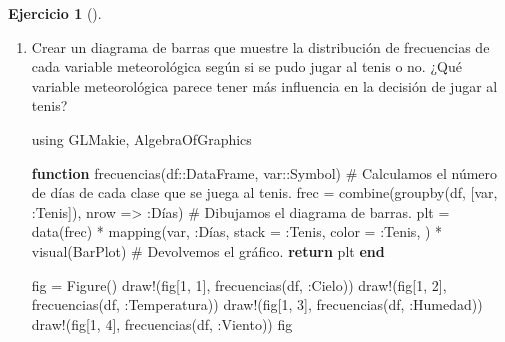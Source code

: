 \documentclass[
  a4paper,
]{scrreport}
\newenvironment{Shaded}{\begin{snugshade}}{\end{snugshade}}
\newcommand{\BuiltInTok}[1]{\textcolor[rgb]{0.00,0.23,0.31}{#1}}
\newcommand{\CommentTok}[1]{\textcolor[rgb]{0.37,0.37,0.37}{#1}}
\newcommand{\ControlFlowTok}[1]{\textcolor[rgb]{0.00,0.23,0.31}{\textbf{#1}}}
\newcommand{\DataTypeTok}[1]{\textcolor[rgb]{0.68,0.00,0.00}{#1}}
\newcommand{\FloatTok}[1]{\textcolor[rgb]{0.68,0.00,0.00}{#1}}
\newcommand{\FunctionTok}[1]{\textcolor[rgb]{0.28,0.35,0.67}{#1}}
\newcommand{\ImportTok}[1]{\textcolor[rgb]{0.00,0.46,0.62}{#1}}
\newcommand{\KeywordTok}[1]{\textcolor[rgb]{0.00,0.23,0.31}{\textbf{#1}}}
\newcommand{\NormalTok}[1]{\textcolor[rgb]{0.00,0.23,0.31}{#1}}
\newcommand{\OperatorTok}[1]{\textcolor[rgb]{0.37,0.37,0.37}{#1}}
\theoremstyle{definition}
\newtheorem{exercise}{Ejercicio}[chapter]
\theoremstyle{remark}
\begin{document}
\begin{exercise}[]
\begin{enumerate}
\begin{tcolorbox}
  \end{tcolorbox}
\item
  Crear un diagrama de barras que muestre la distribución de frecuencias
  de cada variable meteorológica según si se pudo jugar al tenis o no.
  ¿Qué variable meteorológica parece tener más influencia en la decisión
  de jugar al tenis?

  \begin{tcolorbox}[enhanced jigsaw, toptitle=1mm, colframe=quarto-callout-tip-color-frame, titlerule=0mm, left=2mm, arc=.35mm, colbacktitle=quarto-callout-tip-color!10!white, opacityback=0, bottomtitle=1mm, toprule=.15mm, coltitle=black, breakable, colback=white, rightrule=.15mm, opacitybacktitle=0.6, leftrule=.75mm, bottomrule=.15mm, title=\textcolor{quarto-callout-tip-color}{\faLightbulb}\hspace{0.5em}{Solución}]

\begin{Shaded}
\begin{Highlighting}[]
\ImportTok{using} \BuiltInTok{GLMakie}\NormalTok{, }\BuiltInTok{AlgebraOfGraphics}

\KeywordTok{function} \FunctionTok{frecuencias}\NormalTok{(df}\OperatorTok{::}\DataTypeTok{DataFrame}\NormalTok{, var}\OperatorTok{::}\DataTypeTok{Symbol}\NormalTok{)}
    \CommentTok{\# Calculamos el número de días de cada clase que se juega al tenis.}
\NormalTok{    frec }\OperatorTok{=} \FunctionTok{combine}\NormalTok{(}\FunctionTok{groupby}\NormalTok{(df, [var, }\OperatorTok{:}\NormalTok{Tenis]), nrow }\OperatorTok{=\textgreater{}} \OperatorTok{:}\NormalTok{Días)}
    \CommentTok{\# Dibujamos el diagrama de barras.}
\NormalTok{    plt }\OperatorTok{=} \FunctionTok{data}\NormalTok{(frec) }\OperatorTok{*} 
    \FunctionTok{mapping}\NormalTok{(var, }\OperatorTok{:}\NormalTok{Días, stack }\OperatorTok{=} \OperatorTok{:}\NormalTok{Tenis, color }\OperatorTok{=} \OperatorTok{:}\NormalTok{Tenis, ) }\OperatorTok{*} 
    \FunctionTok{visual}\NormalTok{(BarPlot) }
    \CommentTok{\# Devolvemos el gráfico.}
    \ControlFlowTok{return}\NormalTok{ plt}
\KeywordTok{end}

\NormalTok{fig }\OperatorTok{=} \FunctionTok{Figure}\NormalTok{()}
\FunctionTok{draw!}\NormalTok{(fig[}\FloatTok{1}\NormalTok{, }\FloatTok{1}\NormalTok{], }\FunctionTok{frecuencias}\NormalTok{(df, }\OperatorTok{:}\NormalTok{Cielo))}
\FunctionTok{draw!}\NormalTok{(fig[}\FloatTok{1}\NormalTok{, }\FloatTok{2}\NormalTok{], }\FunctionTok{frecuencias}\NormalTok{(df, }\OperatorTok{:}\NormalTok{Temperatura))}
\FunctionTok{draw!}\NormalTok{(fig[}\FloatTok{1}\NormalTok{, }\FloatTok{3}\NormalTok{], }\FunctionTok{frecuencias}\NormalTok{(df, }\OperatorTok{:}\NormalTok{Humedad))}
\FunctionTok{draw!}\NormalTok{(fig[}\FloatTok{1}\NormalTok{, }\FloatTok{4}\NormalTok{], }\FunctionTok{frecuencias}\NormalTok{(df, }\OperatorTok{:}\NormalTok{Viento))}
\NormalTok{fig}
\end{Highlighting}
\end{Shaded}


\end{tcolorbox}
\end{enumerate}
\end{exercise}
\end{document}
